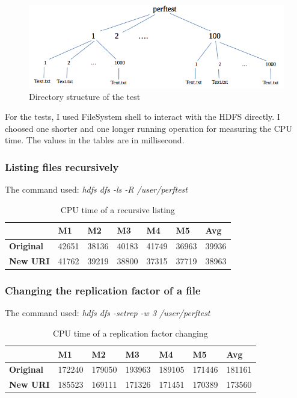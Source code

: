 \begin{figure}[H]
	\includegraphics[width=125mm, keepaspectratio]{figures/directory_structure.png}
	\centering
	\caption{Directory structure of the test}
\end{figure}

For the tests, I used FileSystem shell to interact with the HDFS directly. I choosed one shorter and one longer running operation for measuring the CPU time. The values in the tables are in millisecond.

\subsubsection{Listing files recursively}
The command used:  \textit{hdfs dfs -ls -R /user/perftest}

\begin{table}[H]
	\begin{tabular}{|l|l|l|l|l|l|l|}
		\hline
		& \textbf{M1} & \textbf{M2} & \textbf{M3} & \textbf{M4} & \textbf{M5} & \textbf{Avg} \\ \hline
		\textbf{Original} & 42651    & 38136    & 40183    & 41749    & 36963    & 39936     \\ \hline
		\textbf{New URI}  & 41762    & 39219    & 38800    & 37315    & 37719    & 38963     \\ \hline
	\end{tabular}
\centering
\caption{CPU time of a recursive listing}
\end{table}
\subsubsection{Changing the replication factor of a file}
The command used:  \textit{hdfs dfs -setrep -w 3 /user/perftest}

\begin{table}[H]
	\begin{tabular}{|l|l|l|l|l|l|l|}
		\hline
		& \textbf{M1} & \textbf{M2} & \textbf{M3} & \textbf{M4} & \textbf{M5} & \textbf{Avg} \\ \hline
		\textbf{Original} & 172240      & 179050      & 193963      & 189105      & 171446      & 181161       \\ \hline
		\textbf{New URI}  & 185523      & 169111      & 171326      & 171451      & 170389      & 173560       \\ \hline
	\end{tabular}
\centering
\caption{CPU time of a replication factor changing}
\end{table}


